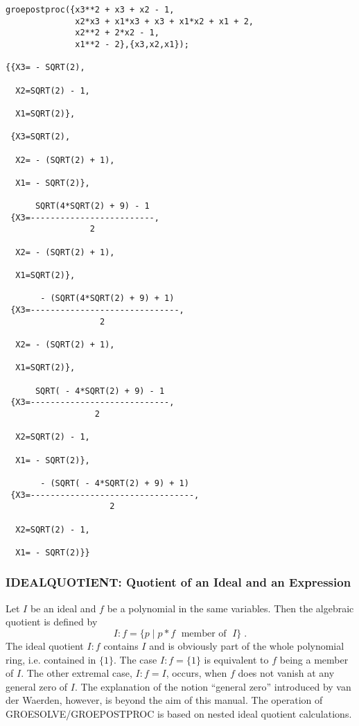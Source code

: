\begin{verbatim}
groepostproc({x3**2 + x3 + x2 - 1,
              x2*x3 + x1*x3 + x3 + x1*x2 + x1 + 2,
              x2**2 + 2*x2 - 1,
              x1**2 - 2},{x3,x2,x1});

{{X3= - SQRT(2),

  X2=SQRT(2) - 1,

  X1=SQRT(2)},

 {X3=SQRT(2),

  X2= - (SQRT(2) + 1),

  X1= - SQRT(2)},

      SQRT(4*SQRT(2) + 9) - 1
 {X3=-------------------------,
                 2

  X2= - (SQRT(2) + 1),

  X1=SQRT(2)},

       - (SQRT(4*SQRT(2) + 9) + 1)
 {X3=------------------------------,
                   2

  X2= - (SQRT(2) + 1),

  X1=SQRT(2)},

      SQRT( - 4*SQRT(2) + 9) - 1
 {X3=----------------------------,
                  2

  X2=SQRT(2) - 1,

  X1= - SQRT(2)},

       - (SQRT( - 4*SQRT(2) + 9) + 1)
 {X3=---------------------------------,
                     2

  X2=SQRT(2) - 1,

  X1= - SQRT(2)}}
\end{verbatim}

\subsubsection{IDEALQUOTIENT: Quotient of an Ideal and an Expression}
 
Let $I$ be an ideal and $f$ be a polynomial in the same
variables. Then the algebraic quotient is defined by
\[
I:f = \{ p \;| \; p * f \;\mbox{    member of }\; I\}\;.
\]
The ideal quotient $I:f$ contains $I$ and is obviously part of the
whole polynomial ring, i.e. contained in $\{1\}$. The case $I:f =
\{1\}$ is equivalent to $f$ being a member of  $I$. The other extremal
case, $I:f=I$, occurs, when $f$ does not vanish at any general zero of $I$.
The explanation of the notion ``general zero'' introduced by van der
Waerden, however, is beyond the aim of this manual. The operation
of GROESOLVE/GROEPOSTPROC is based on nested ideal quotient
calculations.

